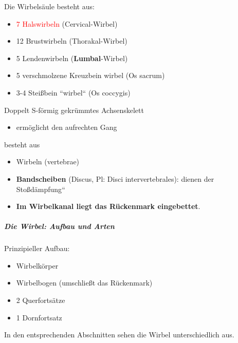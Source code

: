 \documentclass{article}
\newcommand\gEs[1]{\textbf{\textcolor[rgb]{0.0,0.0,0.5019608}{#1}}}
\newcommand\gEs[1]{\textbf{\textcolor[rgb]{0.0,0.0,0.5019608}{#1}}}
\newcommand\gT[1]{\textbf{\textup{\textcolor[rgb]{0.0,0.5019608,0.0}{#1}}}}
\newcommand\gZ[1]{\textcolor[rgb]{0.5019608,0.5019608,0.5019608}{#1}}
\begin{document}
{%
Die Wirbels\"aule besteht aus:}

\begin{itemize}
\item \textcolor{red}{7 Halswirbeln}  (Cervical-Wirbel)

\item \textcolor[rgb]{0.0,0.0,0.5019608}{12 Brustwirbeln} 
(Thorakal-Wirbel)

\item \textcolor[rgb]{0.0,0.5019608,0.0}{5 Lendenwirbeln} 
(\gEs{Lumbal}{}-Wirbel)

\item 5 verschmolzene Kreuzbein wirbel (Os sacrum)

\item \textcolor[rgb]{0.5019608,0.0,0.0}{3-4 Stei{\ss}bein
{\textquotedblleft}wirbel{\textquotedblleft}}  \gZ{(Os
coccygis)} 

\end{itemize}
{\mdseries
Doppelt S-f\"ormig gekr\"ummtes Achsenskelett}

\begin{itemize}
\item {\mdseries
erm\"oglicht den aufrechten Gang}

\end{itemize}
{\mdseries\color{black}
besteht aus}

\begin{itemize}
\item {\mdseries
Wirbeln \gZ{(vertebrae)}}

\item {\mdseries
{}\gT{Bandscheiben} (Discus,
\gZ{Pl: Disci intervertebrales}): dienen der
{\quotedblbase}Sto{\ss}d\"ampfung{\textquotedblleft}}

\item {\mdseries
\gEs{Im Wirbelkanal liegt das R\"uckenmark
eingebettet}.}

\end{itemize}
\subparagraph{Die Wirbel: Aufbau und Arten}
{\mdseries
Prinzipieller Aufbau:}

\begin{itemize}
\item Wirbelk\"orper

\item Wirbelbogen  (umschlie{\ss}t das R\"uckenmark)

\item 2 Querforts\"atze

\item 1 Dornfortsatz

\end{itemize}
{\mdseries
%
%
In den entsprechenden Abschnitten sehen die Wirbel unterschiedlich aus.
}
\end{document}
